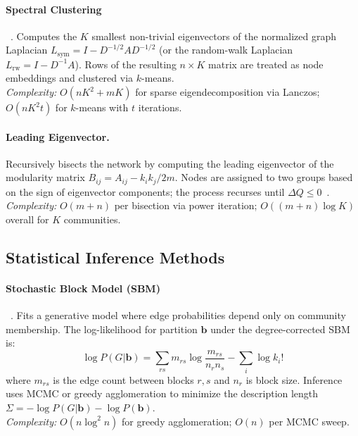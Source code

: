 \documentclass[11pt]{article}
\begin{document}
\paragraph{Spectral Clustering}~\citep{ulrike_von_luxburg_b9cd91aa}.
Computes the $K$ smallest non-trivial eigenvectors of the normalized graph Laplacian $L_\text{sym} = I - D^{-1/2}AD^{-1/2}$ (or the random-walk Laplacian $L_\text{rw} = I - D^{-1}A$). Rows of the resulting $n \times K$ matrix are treated as node embeddings and clustered via $k$-means.\\
\emph{Complexity:} $O(n K^2 + m K)$ for sparse eigendecomposition via Lanczos; $O(nK^2 t)$ for $k$-means with $t$ iterations.

\paragraph{Leading Eigenvector.}
Recursively bisects the network by computing the leading eigenvector of the modularity matrix $B_{ij} = A_{ij} - k_i k_j / 2m$. Nodes are assigned to two groups based on the sign of eigenvector components; the process recurses until $\Delta Q \leq 0$~\citep{m__e__j__newman_cfc12888}.\\
\emph{Complexity:} $O(m + n)$ per bisection via power iteration; $O((m+n)\log K)$ overall for $K$ communities.

\subsection{Statistical Inference Methods}

\paragraph{Stochastic Block Model (SBM)}~\citep{peixoto_sbm_2014}.
Fits a generative model where edge probabilities depend only on community membership. The log-likelihood for partition $\mathbf{b}$ under the degree-corrected SBM is:
\[
\log P(G|\mathbf{b}) = \sum_{rs} m_{rs}\log\frac{m_{rs}}{n_r n_s} - \sum_i \log k_i!
\]
where $m_{rs}$ is the edge count between blocks $r,s$ and $n_r$ is block size. Inference uses MCMC or greedy agglomeration to minimize the description length $\Sigma = -\log P(G|\mathbf{b}) - \log P(\mathbf{b})$.\\
\emph{Complexity:} $O(n\log^2 n)$ for greedy agglomeration; $O(n)$ per MCMC sweep.
\end{document}
